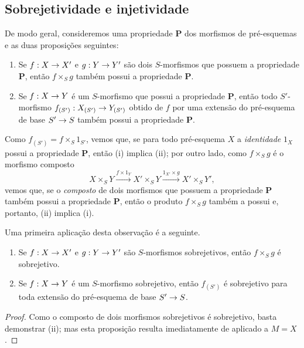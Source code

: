 \documentclass[oneside]{amsart}
\makeatletter
\newcommand{\ega@arrow}[2]{\mathchoice{#1}{#2}{#2}{#2}}
\renewcommand{\to}{\ega@arrow{\longrightarrow}{\rightarrow}}
\newcommand{\oldpage}[2][]{{\marginnote{\normalfont\textbf{#1}~|~#2}}\ignorespaces}
\let\EGAOriginalLabel\label
\renewcommand{\label}[1]{\phantomsection\EGAOriginalLabel{#1}}
\makeatother
\begin{document}
\subsection{Sobrejetividade e injetividade}
\label{subsection:I.3.5}

\begin{env}[3.5.1]
\label{I.3.5.1}
De modo geral, consideremos uma propriedade $\textbf{P}$ dos morfismos de
pré-esquemas e as duas proposições seguintes:
\begin{enumerate}
  \item[(i)] Se $f:X\to X'$ e $g:Y\to Y'$ são dois $S$-morfismos que possuem
  a propriedade $\textbf{P}$, então $f\times_S g$ também possui a propriedade
  $\textbf{P}$.
  \item[(ii)] Se $f:X\to Y$ é um $S$-morfismo que possui a propriedade
  $\textbf{P}$, então todo $S'$-morfismo
  $f_{(S')}:X_{(S')}\to Y_{(S')}$ obtido de $f$ por uma extensão do
  pré-esquema de base $S'\to S$ também possui a propriedade $\textbf{P}$.
\end{enumerate}

\oldpage[I]{115}
Como $f_{(S')}=f\times_S 1_{S'}$, vemos que, se para todo pré-esquema $X$ a
\emph{identidade} $1_X$ possui a propriedade $\textbf{P}$, então (i) implica
(ii); por outro lado, como $f\times_S g$ é o morfismo composto
\[
  X\times_S Y\xrightarrow{f\times1_Y}X'\times_S Y\xrightarrow{1_{X'}\times g}X'\times_S Y',
\]
vemos que, se o \emph{composto} de dois morfismos que possuem a propriedade
$\textbf{P}$ também possui a propriedade $\textbf{P}$, então o produto
$f\times_S g$ também a possui e, portanto, (ii) implica (i).
\end{env}

Uma primeira aplicação desta observação é a seguinte.

\begin{proposition}[3.5.2]
\label{I.3.5.2}
\medskip\noindent
\begin{enumerate}
  \item[{\rm(i)}] Se $f:X\to X'$ e $g:Y\to Y'$ são $S$-morfismos
  sobrejetivos, então $f\times_S g$ é sobrejetivo.
  \item[{\rm(ii)}] Se $f:X\to Y$ é um $S$-morfismo sobrejetivo, então
  $f_{(S')}$ é sobrejetivo para toda extensão do pré-esquema de base
  $S'\to S$.
\end{enumerate}
\end{proposition}

\begin{proof}
Como o composto de dois morfismos sobrejetivos é sobrejetivo, basta demonstrar
(ii); mas esta proposição resulta imediatamente de  aplicado a
$M=X$.
\end{proof}
\end{document}
